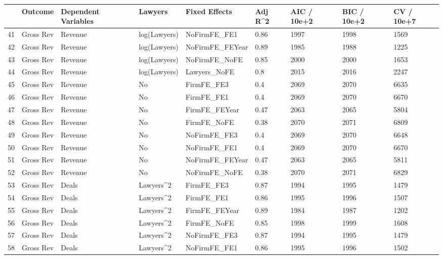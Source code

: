 \documentclass{article}
\begin{document}
\begin{table}[H]
\centering
\begin{tabular}{rllllllll}
  \hline
 & Outcome & Dependent Variables & Lawyers & Fixed Effects & Adj R^2 & AIC / 10e+2 & BIC / 10e+2 & CV / 10e+7 \\ 
  \hline
41 & Gross Rev & Revenue & log(Lawyers) & NoFirmFE\_FE1 & 0.86 & 1997 & 1998 & 1569 \\ 
  42 & Gross Rev & Revenue & log(Lawyers) & NoFirmFE\_FEYear & 0.89 & 1985 & 1988 & 1225 \\ 
  43 & Gross Rev & Revenue & log(Lawyers) & NoFirmFE\_NoFE & 0.85 & 2000 & 2000 & 1653 \\ 
  44 & Gross Rev & Revenue & log(Lawyers) & Lawyers\_NoFE & 0.8 & 2015 & 2016 & 2247 \\ 
  45 & Gross Rev & Revenue & No & FirmFE\_FE3 & 0.4 & 2069 & 2070 & 6635 \\ 
  46 & Gross Rev & Revenue & No & FirmFE\_FE1 & 0.4 & 2069 & 2070 & 6670 \\ 
  47 & Gross Rev & Revenue & No & FirmFE\_FEYear & 0.47 & 2063 & 2065 & 5804 \\ 
  48 & Gross Rev & Revenue & No & FirmFE\_NoFE & 0.38 & 2070 & 2071 & 6809 \\ 
  49 & Gross Rev & Revenue & No & NoFirmFE\_FE3 & 0.4 & 2069 & 2070 & 6648 \\ 
  50 & Gross Rev & Revenue & No & NoFirmFE\_FE1 & 0.4 & 2069 & 2070 & 6670 \\ 
  51 & Gross Rev & Revenue & No & NoFirmFE\_FEYear & 0.47 & 2063 & 2065 & 5811 \\ 
  52 & Gross Rev & Revenue & No & NoFirmFE\_NoFE & 0.38 & 2070 & 2071 & 6829 \\ 
  53 & Gross Rev & Deals & Lawyers^2 & FirmFE\_FE3 & 0.87 & 1994 & 1995 & 1479 \\ 
  54 & Gross Rev & Deals & Lawyers^2 & FirmFE\_FE1 & 0.86 & 1995 & 1996 & 1507 \\ 
  55 & Gross Rev & Deals & Lawyers^2 & FirmFE\_FEYear & 0.89 & 1984 & 1987 & 1202 \\ 
  56 & Gross Rev & Deals & Lawyers^2 & FirmFE\_NoFE & 0.85 & 1998 & 1999 & 1608 \\ 
  57 & Gross Rev & Deals & Lawyers^2 & NoFirmFE\_FE3 & 0.87 & 1994 & 1995 & 1479 \\ 
  58 & Gross Rev & Deals & Lawyers^2 & NoFirmFE\_FE1 & 0.86 & 1995 & 1996 & 1502 \\ 

\end{tabular}
\end{table}
\end{document}
